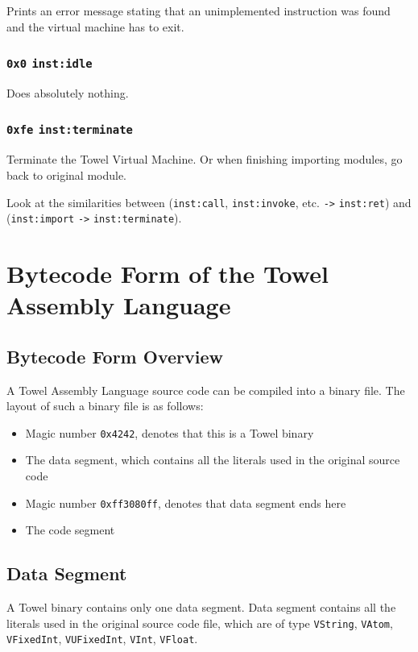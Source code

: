 \documentclass{report}
\newcommand{\inst}[1] {\texttt{inst:#1}}
\begin{document}
Prints an error message stating that an unimplemented instruction was found and the virtual machine has to exit.

\subsection{\texttt{0x0} \inst{idle}}

Does absolutely nothing.

\subsection{\texttt{0xfe} \inst{terminate}}

Terminate the Towel Virtual Machine. Or when finishing importing modules, go back to original module.

\begin{mdframed}[style=hint]
  Look at the similarities between (\inst{call}, \inst{invoke},
  etc. \texttt{->} \inst{ret}) and (\inst{import} \texttt{->}
  \inst{terminate}).
\end{mdframed}

\chapter{Bytecode Form of the Towel Assembly Language}

\section{Bytecode Form Overview}

A Towel Assembly Language source code can be compiled into a binary file. The layout of such a binary file is as follows:
\begin{itemize}
\item Magic number \texttt{0x4242}, denotes that this is a Towel binary
\item The data segment, which contains all the literals used in the original source code
\item Magic number \texttt{0xff3080ff}, denotes that data segment ends here
\item The code segment
\end{itemize}

\section{Data Segment}
A Towel binary contains only one data segment. Data segment contains all the literals used in the original source code file, which are of type \texttt{VString}, \texttt{VAtom}, \texttt{VFixedInt}, \texttt{VUFixedInt}, \texttt{VInt}, \texttt{VFloat}.
\end{document}
